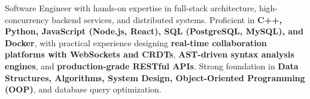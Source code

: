 Software Engineer with hands-on expertise in full-stack architecture, high-concurrency backend services, and distributed systems. Proficient in \textbf{C++, Python, JavaScript (Node.js, React), SQL (PostgreSQL, MySQL), and Docker}, with practical experience designing \textbf{real-time collaboration platforms with WebSockets and CRDTs}, \textbf{AST-driven syntax analysis engines}, and \textbf{production-grade RESTful APIs}. Strong foundation in \textbf{Data Structures, Algorithms, System Design, Object-Oriented Programming (OOP)}, and database query optimization.
